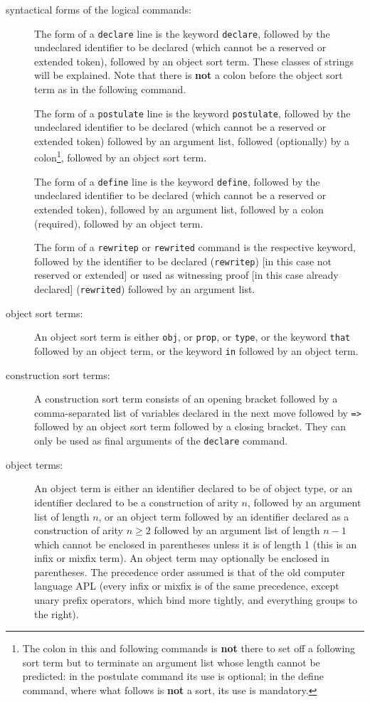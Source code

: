\documentclass[12pt]{article}
\begin{document}
\begin{description}
\item[syntactical forms of the logical commands:]  The form of a {\tt declare} line is the keyword {\tt declare}, followed by the undeclared identifier to be declared (which cannot be a reserved or extended token), 
followed by an object sort term.   These classes of strings will be explained.  Note that there is {\bf not} a colon before the object sort term as in the following command.

The form of a {\tt postulate} line is the keyword {\tt postulate}, followed by the undeclared identifier to be declared (which cannot be a reserved or extended token) followed by an argument list,
followed (optionally) by a colon\footnote{The colon in this and following commands is {\bf not} there to set off a following sort term but to terminate an argument list whose length cannot be predicted:  in the postulate command its use is optional;  in the define command, where what follows is {\bf not} a sort, its use is mandatory.}, followed by an object sort term.

The form of a {\tt define} line is the keyword {\tt define}, followed by the undeclared identifier to be declared (which cannot be a reserved or extended token), followed by an argument list,
followed by a colon (required), followed by an object term.

The form of a {\tt rewritep} or {\tt rewrited} command is the respective keyword, followed by the identifier to be declared ({\tt rewritep}) [in this case not reserved or extended]  or used as witnessing proof [in this case already declared] ({\tt rewrited})
followed by an argument list.

\item[object sort terms:]  An object sort term is either {\tt obj}, or {\tt prop}, or {\tt type}, or the keyword {\tt that} followed by an object term, or the keyword {\tt in} followed by an object term.

\item[construction sort terms:]  A  construction sort term consists of an opening bracket followed by a comma-separated list of variables declared in the next move followed by {\tt =>} followed by an object sort term followed by a closing bracket.  They can only be used as final arguments of the {\tt declare} command.

\item[object terms:]  An object term is either an identifier declared to be of object type, or an identifier declared to be a construction of arity $n$, followed by an argument list of length $n$,
or an object term followed by an identifier declared as a construction of arity $n \geq 2$  followed by an argument list of length $n-1$ which cannot be enclosed in parentheses unless it is of length 1
(this is an infix or mixfix term).  An object term may optionally be enclosed in parentheses.  The precedence order assumed is that of the old computer language APL (every infix or mixfix is of the same precedence, except unary prefix operators, which bind more tightly, and everything groups to the right).


\end{description}
\end{document}

